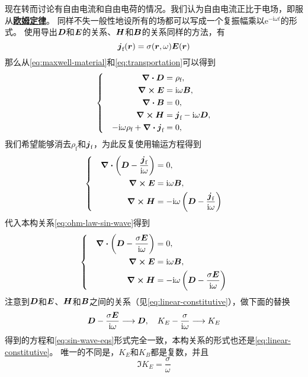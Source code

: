 \documentclass[UTF8, a4paper]{ctexart}
\newcommand*{\ii}{\mathrm{i}}
\newcommand*{\ee}{\mathrm{e}}
\newcommand*{\concept}[1]{\underline{\textbf{#1}}}
\newenvironment{bigcase}{\left\{\quad\begin{aligned}}{\end{aligned}\right.}
\begin{document}
现在转而讨论有自由电流和自由电荷的情况。我们认为自由电流正比于电场，即服从\concept{欧姆定律}。
同样不失一般性地设所有的场都可以写成一个复振幅乘以$\ee^{- \ii \omega t}$的形式。
使用导出$\vb*{D}$和$\vb*{E}$的关系、$\vb*{H}$和$\vb*{B}$的关系同样的方法，有
\begin{equation}
    \vb*{j}_\text{f}(\vb*{r}) = \sigma(\vb*{r}, \omega) \vb*{E}(\vb*{r})
    \label{eq:ohm-law-sin-wave}
\end{equation}
那么从\eqref{eq:maxwell-material}和\eqref{eq:transportation}可以得到
\[
    \begin{bigcase}
        \div{\vb*{D}} &= \rho_\text{f}, \\
        \curl{\vb*{E}} &= \ii \omega \vb*{B}, \\
        \div{\vb*{B}} &= 0, \\
        \curl{\vb*{H}} &= \vb*{j}_\text{f} - \ii \omega \vb*{D}, \\
        - \ii \omega \rho_\text{f} + \div{\vb*{j}_\text{f}} &= 0,
    \end{bigcase}
\]
我们希望能够消去$\rho_\text{f}$和$\vb*{j}_\text{f}$，为此反复使用输运方程得到
\[
    \begin{bigcase}
        \div{\left( \vb*{D} - \frac{\vb*{j}_\text{f}}{\ii \omega} \right)   } &= 0, \\
        \curl{\vb*{E}} &= \ii \omega \vb*{B}, \\
        \curl{\vb*{H}} &=  - \ii \omega \left( \vb*{D} - \frac{\vb*{j}_\text{f}}{\ii \omega} \right)
    \end{bigcase}
\]
代入本构关系\eqref{eq:ohm-law-sin-wave}得到
\[
    \begin{bigcase}
        \div{\left( \vb*{D} - \frac{\sigma \vb*{E}}{\ii \omega} \right)   } &= 0, \\
        \curl{\vb*{E}} &= \ii \omega \vb*{B}, \\
        \curl{\vb*{H}} &=  - \ii \omega \left( \vb*{D} - \frac{\sigma \vb*{E}}{\ii \omega} \right)
    \end{bigcase}
\]
注意到$\vb*{D}$和$\vb*{E}$、$\vb*{H}$和$\vb*{B}$之间的关系（见\eqref{eq:linear-constitutive}），做下面的替换
\[
    \vb*{D} - \frac{\sigma \vb*{E}}{\ii \omega} \longrightarrow \vb*{D}, \quad K_E - \frac{\sigma}{\ii \omega} \longrightarrow K_E
\]
得到的方程和\eqref{eq:sin-wave-eqs}形式完全一致，本构关系的形式也还是\eqref{eq:linear-constitutive}。
唯一的不同是，$K_E$和$K_B$都是复数，并且
\begin{equation}
    \Im K_E = \frac{\sigma}{\omega}
\end{equation}
\end{document}
